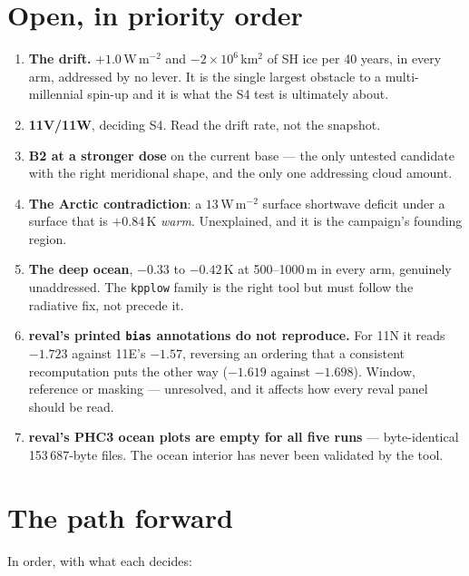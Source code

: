 \documentclass[10pt]{article}
\begin{document}
\section{Open, in priority order}\label{sec:open}
\begin{enumerate}\itemsep1pt
\item \textbf{The drift.} $+1.0$\,W\,m$^{-2}$ and $-2\times10^6$\,km$^2$ of SH ice per 40
years, in every arm, addressed by no lever. It is the single largest obstacle to a
multi-millennial spin-up and it is what the S4 test is ultimately about.
\item \textbf{11V/11W}, deciding S4. Read the drift rate, not the snapshot.
\item \textbf{B2 at a stronger dose} on the current base --- the only untested candidate
with the right meridional shape, and the only one addressing cloud amount.
\item \textbf{The Arctic contradiction}: a $13$\,W\,m$^{-2}$ surface shortwave deficit
under a surface that is $+0.84$\,K \emph{warm}. Unexplained, and it is the campaign's
founding region.
\item \textbf{The deep ocean}, $-0.33$ to $-0.42$\,K at 500--1000\,m in every arm, genuinely
unaddressed. The \texttt{kpplow} family is the right tool but must follow the radiative fix,
not precede it.
\item \textbf{reval's printed \texttt{bias} annotations do not reproduce.}
For 11N it reads $-1.723$ against 11E's $-1.57$, reversing an ordering that a
consistent recomputation puts the other way ($-1.619$ against $-1.698$). Window,
reference or masking --- unresolved, and it affects how every reval panel should be read.
\item \textbf{reval's PHC3 ocean plots are empty for all five runs} --- byte-identical
153\,687-byte files. The ocean interior has never been validated by the tool.
\end{enumerate}

\section{The path forward}\label{sec:forward}
In order, with what each decides:
\end{document}
